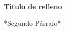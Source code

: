 \documentclass[12pt]{article}
\begin{document}
    \begin{center}
        \textbf{Titulo de relleno}
    \end{center}

    \noindent 
    
    *Segundo Párrafo*    

    \lipsum

\end{document}
